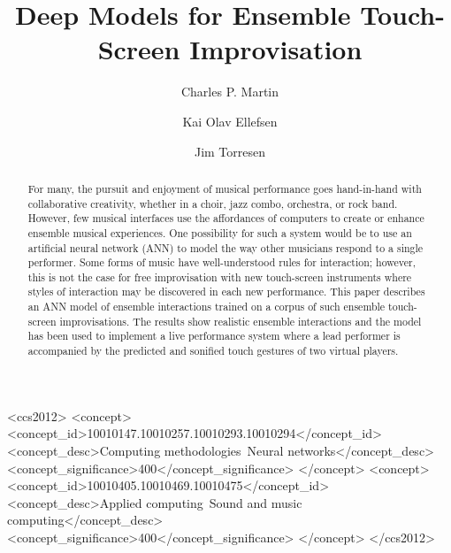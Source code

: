 \documentclass[sigchi]{acmart} %
\begin{document}

\title{Deep Models for Ensemble Touch-Screen Improvisation}

\author{Charles P. Martin}

\author{Kai Olav Ellefsen}

\author{Jim Torresen}

\begin{abstract}
  For many, the pursuit and enjoyment of musical performance goes
  hand-in-hand with collaborative creativity, whether in a choir, jazz
  combo, orchestra, or rock band. However, few musical interfaces use
  the affordances of computers to create or enhance ensemble musical
  experiences. One possibility for such a system would be to use an
  artificial neural network (ANN) to model the way other musicians
  respond to a single performer. Some forms of music have
  well-understood rules for interaction; however, this is not the case
  for free improvisation with new touch-screen instruments where
  styles of interaction may be discovered in each new performance.
  This paper describes an ANN model of ensemble interactions trained
  on a corpus of such ensemble touch-screen improvisations. The
  results show realistic ensemble interactions and the model has been
  used to implement a live performance system where a lead performer
  is accompanied by the predicted and sonified touch gestures of two virtual players.
\end{abstract}

\begin{CCSXML}
<ccs2012>
<concept>
<concept_id>10010147.10010257.10010293.10010294</concept_id>
<concept_desc>Computing methodologies~Neural networks</concept_desc>
<concept_significance>400</concept_significance>
</concept>
<concept>
<concept_id>10010405.10010469.10010475</concept_id>
<concept_desc>Applied computing~Sound and music computing</concept_desc>
<concept_significance>400</concept_significance>
</concept>
</ccs2012>
\end{CCSXML}
\end{document}
